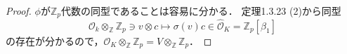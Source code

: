\begin{proof}
  $\phi$が$\mathbb{Z}_p$代数の同型であることは容易に分かる．
  定理1.3.23 (2)から同型
  \[ \mathcal{O}_k \otimes_\mathbb{Z} \mathbb{Z}_p \ni v \otimes c \mapsto \sigma(v)c \in \widehat{\mathcal{O}}_K = \mathbb{Z}_p[\beta_1] \]
  の存在が分かるので，$\mathcal{O}_K \otimes_\mathbb{Z} \mathbb{Z}_p = V \otimes_\mathbb{Z} \mathbb{Z}_p$．
\end{proof}

